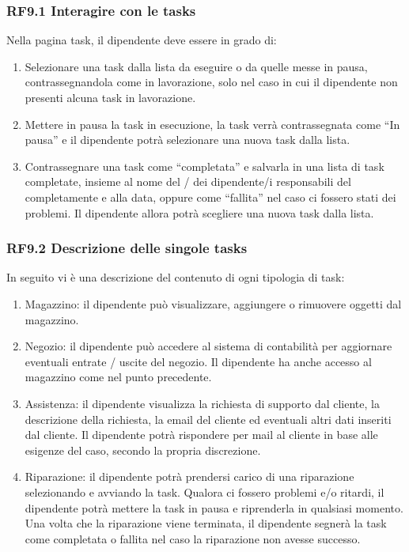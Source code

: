 \documentclass{report}
\begin{document}
\subsubsection*{RF9.1 Interagire con le tasks}

Nella pagina task, il dipendente deve essere in grado di:


\begin{enumerate}
	\item Selezionare una task dalla lista da eseguire o da quelle messe in pausa, contrassegnandola come in lavorazione, solo nel caso in cui il dipendente non presenti alcuna task in lavorazione.
	
	\item Mettere in pausa la task in esecuzione, la task verrà contrassegnata come “In pausa” e il dipendente potrà selezionare una nuova task dalla lista.
	
	\item Contrassegnare una task come “completata” e salvarla in una lista di task completate, insieme al nome del / dei dipendente/i responsabili del completamente e alla data, oppure come “fallita” nel caso ci fossero stati dei problemi. Il dipendente allora potrà scegliere una nuova task dalla lista.
\end{enumerate}

\subsubsection*{RF9.2 Descrizione delle singole tasks}

In seguito vi è una descrizione del contenuto di ogni tipologia di task:


\begin{enumerate}
	\item Magazzino: il dipendente può visualizzare, aggiungere o rimuovere oggetti dal magazzino.
	
	\item Negozio: il dipendente può accedere al sistema di contabilità per aggiornare eventuali entrate / uscite del negozio. Il dipendente ha anche accesso al magazzino come nel punto precedente.
	
	\item Assistenza: il dipendente visualizza la richiesta di supporto dal cliente, la descrizione della richiesta, la email del cliente ed eventuali altri dati inseriti dal cliente. Il dipendente potrà rispondere per mail al cliente in base alle esigenze del caso, secondo la propria discrezione.
	
	\item Riparazione: il dipendente potrà prendersi carico di una riparazione selezionando e avviando la task. Qualora ci fossero problemi e/o ritardi, il dipendente potrà mettere la task in pausa e riprenderla in qualsiasi momento. Una volta che la riparazione viene terminata, il dipendente segnerà la task come completata o fallita nel caso la riparazione non avesse successo.
	
\end{enumerate}
\end{document}
